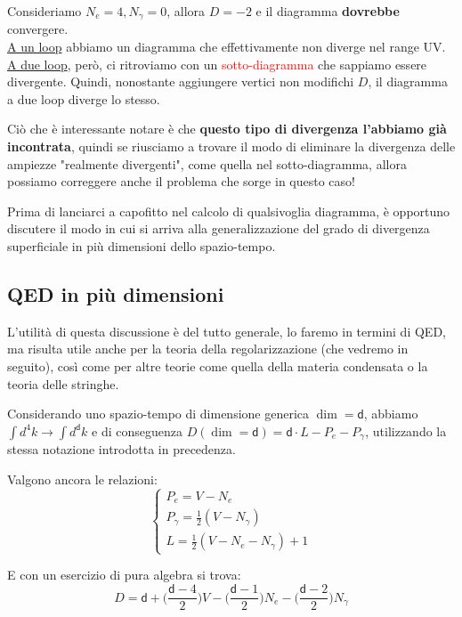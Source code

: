 \documentclass[../main.tex]{subfiles}
\begin{document}
Consideriamo $N_e=4, N_\gamma=0$, allora $D=-2$ e il diagramma \textbf{dovrebbe} convergere.\\
\underline{A un loop} abbiamo un diagramma che effettivamente non diverge nel range UV.\\
\underline{A due loop}, però, ci ritroviamo con un \textcolor{red}{sotto-diagramma} che sappiamo essere divergente. Quindi, nonostante aggiungere vertici non modifichi $D$, il diagramma a due loop diverge lo stesso.

Ciò che è interessante notare è che \textbf{questo tipo di divergenza l'abbiamo già incontrata}, quindi se riusciamo a trovare il modo di eliminare la divergenza delle ampiezze "realmente divergenti", come quella nel sotto-diagramma, allora possiamo correggere anche il problema che sorge in questo caso!

Prima di lanciarci a capofitto nel calcolo di qualsivoglia diagramma, è opportuno discutere il modo in cui si arriva alla generalizzazione del grado di divergenza superficiale in più dimensioni dello spazio-tempo.

\subsection{QED in più dimensioni}
L'utilità di questa discussione è del tutto generale, lo faremo in termini di QED, ma risulta utile anche per la teoria della regolarizzazione (che vedremo in seguito), così come per altre teorie come quella della materia condensata o la teoria delle stringhe.

Considerando uno spazio-tempo di dimensione generica $\dim = \mathsf{d}$, abbiamo $\int d^4k \rightarrow \int d^\mathsf{d}k$ e di conseguenza $D(\dim = \mathsf{d}) = \mathsf{d}\cdot L - P_e - P_\gamma $, utilizzando la stessa notazione introdotta in precedenza.

Valgono ancora le relazioni:
\[
\begin{cases}
P_e = V - N_e\\
P_\gamma = \frac{1}{2}(V - N_\gamma)\\
L = \frac{1}{2}(V - N_e - N_\gamma) + 1
\end{cases}
\]

E con un esercizio di pura algebra si trova:
\begin{equation}
    D = \mathsf{d} + \bigg(\frac{\mathsf{d}-4}{2}\bigg)V - \bigg(\frac{\mathsf{d}-1}{2}\bigg)N_e - \bigg(\frac{\mathsf{d}-2}{2}\bigg)N_\gamma
    \label{eq:generalized_degree_divergence}
\end{equation}
\end{document}
